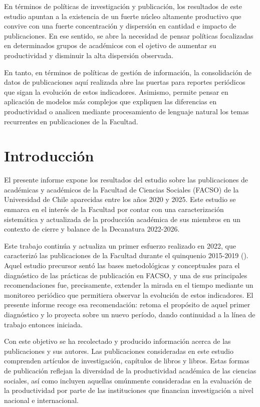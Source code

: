 \documentclass[
  a4paper,
  oneside]{scrbook}
\begin{document}
En términos de políticas de investigación y publicación, los resultados
de este estudio apuntan a la existencia de un fuerte núcleo altamente
productivo que convive con una fuerte concentración y dispersión en
cantidad e impacto de publicaciones. En ese sentido, se abre la
necesidad de pensar políticas focalizadas en determinados grupos de
académicos con el ojetivo de aumentar su productividad y disminuir la
alta dispersión observada.

En tanto, en términos de políticas de gestión de información, la
consolidación de datos de publicaciones aquí realizada abre las puertas
para reportes periódicos que sigan la evolución de estos indicadores.
Asimismo, permite pensar en aplicación de modelos más complejos que
expliquen las diferencias en productividad o analicen mediante
procesamiento de lenguaje natural los temas recurrentes en publicaciones
de la Facultad.


\chapter{Introducción}\label{sec-introduction}

\renewcommand{\thechapter}{\arabic{chapter}}

El presente informe expone los resultados del estudio sobre las
publicaciones de académicas y académicos de la Facultad de Ciencias
Sociales (FACSO) de la Universidad de Chile aparecidas entre los años
2020 y 2025. Este estudio se enmarca en el interés de la Facultad por
contar con una caracterización sistemática y actualizada de la
producción académica de sus miembros en un contexto de cierre y balance
de la Decanatura 2022-2026.

Este trabajo continúa y actualiza un primer esfuerzo realizado en 2022,
que caracterizó las publicaciones de la Facultad durante el quinquenio
2015-2019 (). Aquel
estudio precursor sentó las bases metodológicas y conceptuales para el
diagnóstico de las prácticas de publicación en FACSO, y una de sus
principales recomendaciones fue, precisamente, extender la mirada en el
tiempo mediante un monitoreo periódico que permitiera observar la
evolución de estos indicadores. El presente informe recoge esa
recomendación: retoma el propósito de aquel primer diagnóstico y lo
proyecta sobre un nuevo período, dando continuidad a la línea de trabajo
entonces iniciada.

Con este objetivo se ha recolectado y producido información acerca de
las publicaciones y sus autores. Las publicaciones consideradas en este
estudio comprenden artículos de investigación, capítulos de libros y
libros. Estas formas de publicación reflejan la diversidad de la
productividad académica de las ciencias sociales, así como incluyen
aquellas omúnmente consideradas en la evaluación de la productividad por
parte de las instituciones que financian investigación a nivel nacional
e internacional.
\end{document}
